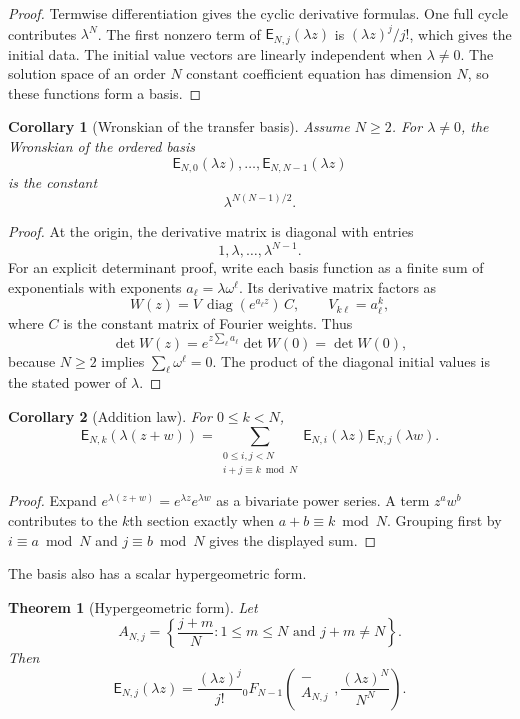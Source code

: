 \documentclass[11pt]{article}
\newtheorem{theorem}{Theorem}[section]
\newtheorem{corollary}[corollary]{Corollary}
\theoremstyle{definition}
\theoremstyle{remark}
\newcommand{\Efun}{\mathsf E}
\begin{document}
\begin{proof}
Termwise differentiation gives the cyclic derivative formulas.  One full cycle contributes $\lambda^N$.  The first nonzero term of $\Efun_{N,j}(\lambda z)$ is $(\lambda z)^j/j!$, which gives the initial data.  The initial value vectors are linearly independent when $\lambda\ne0$.  The solution space of an order $N$ constant coefficient equation has dimension $N$, so these functions form a basis.
\end{proof}


\begin{corollary}[Wronskian of the transfer basis]\label{cor:wronskians}
Assume $N\geq2$. For $\lambda\ne0$, the Wronskian of the ordered basis
\[
\Efun_{N,0}(\lambda z),\ldots,\Efun_{N,N-1}(\lambda z)
\]
is the constant
\[
\lambda^{N(N-1)/2}.
\]
\end{corollary}

\begin{proof}
At the origin, the derivative matrix is diagonal with entries
\[
1,\lambda,\ldots,\lambda^{N-1}.
\]
For an explicit determinant proof, write each basis function as a finite
sum of exponentials with exponents $a_\ell=\lambda\omega^\ell$.
Its derivative matrix factors as
\[
W(z)=V\,\operatorname{diag}(e^{a_\ell z})\,C,
\qquad V_{k\ell}=a_\ell^k,
\]
where $C$ is the constant matrix of Fourier weights. Thus
\[
\det W(z)=e^{z\sum_\ell a_\ell}\det W(0)=\det W(0),
\]
because $N\geq2$ implies $\sum_\ell\omega^\ell=0$.
The product of the diagonal initial values is the stated power of $\lambda$.
\end{proof}

\begin{corollary}[Addition law]\label{cor:exponential_addition}
For $0\leq k<N$,
\[
\Efun_{N,k}(\lambda(z+w))
=
\sum_{\substack{0\leq i,j<N\\ i+j\equiv k\bmod N}}
\Efun_{N,i}(\lambda z)\Efun_{N,j}(\lambda w).
\]
\end{corollary}

\begin{proof}
Expand $e^{\lambda(z+w)}=e^{\lambda z}e^{\lambda w}$ as a
bivariate power series.  A term $z^a w^b$ contributes to the
$k$th section exactly when $a+b\equiv k\bmod N$.  Grouping first by
$i\equiv a\bmod N$ and $j\equiv b\bmod N$ gives the displayed sum.
\end{proof}

The basis also has a scalar hypergeometric form.

\begin{theorem}[Hypergeometric form]\label{thm:hypergeometric_form}
Let
\[
A_{N,j}
=
\left\{
\frac{j+m}{N}
\mathrel{:}
1\leq m\leq N
\text{ and }
j+m\ne N
\right\}.
\]
Then
\[
\Efun_{N,j}(\lambda z)
=
\frac{(\lambda z)^j}{j!}
{}_0F_{N-1}
\left(
\begin{matrix}-\\ A_{N,j}\end{matrix}
\mathrel{,}
\frac{(\lambda z)^N}{N^N}
\right).
\]
\end{theorem}
\end{document}
